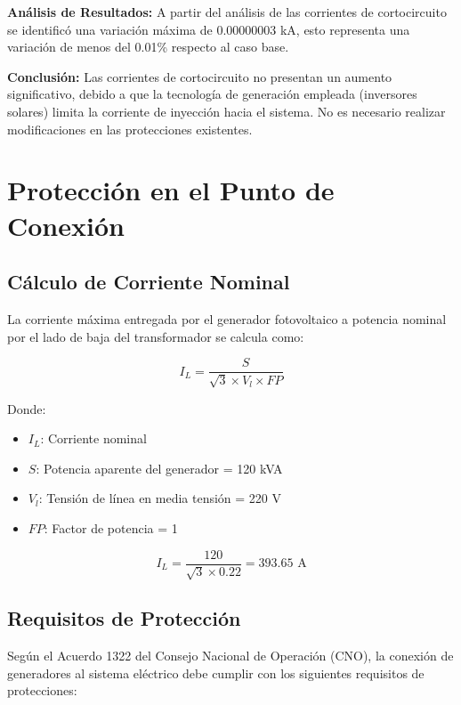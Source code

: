 \textbf{Análisis de Resultados:} A partir del análisis de las corrientes de cortocircuito se identificó una variación máxima de 0.00000003 kA, esto representa una variación de menos del 0.01\% respecto al caso base.

\textbf{Conclusión:} Las corrientes de cortocircuito no presentan un aumento significativo, debido a que la tecnología de generación empleada (inversores solares) limita la corriente de inyección hacia el sistema. No es necesario realizar modificaciones en las protecciones existentes.

\section{Protección en el Punto de Conexión}

\subsection{Cálculo de Corriente Nominal}

La corriente máxima entregada por el generador fotovoltaico a potencia nominal por el lado de baja del transformador se calcula como:

\begin{equation}
I_L = \frac{S}{\sqrt{3} \times V_l \times FP}
\end{equation}

Donde:
\begin{itemize}
    \item $I_L$: Corriente nominal
    \item $S$: Potencia aparente del generador = 120 kVA
    \item $V_l$: Tensión de línea en media tensión = 220 V
    \item $FP$: Factor de potencia = 1
\end{itemize}

\begin{equation}
I_L = \frac{120}{\sqrt{3} \times 0.22} = 393.65 \text{ A}
\end{equation}

\subsection{Requisitos de Protección}

Según el Acuerdo 1322 del Consejo Nacional de Operación (CNO), la conexión de generadores al sistema eléctrico debe cumplir con los siguientes requisitos de protecciones:


